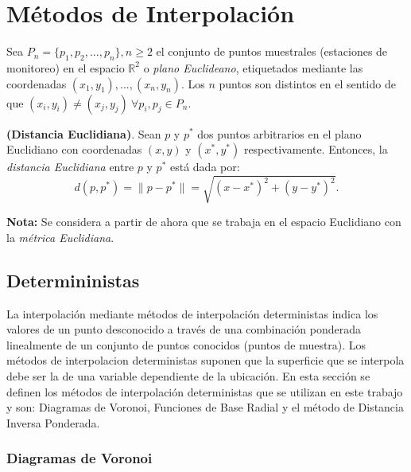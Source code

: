 \section{Métodos de Interpolación}

Sea $P_{n} = \{ p_{1}, p_{2}, ..., p_{n} \}, n \geq 2$ el conjunto de puntos muestrales (estaciones de monitoreo) en el espacio $\mathbb{R}^{2}$ o \textit{plano Euclideano}, etiquetados mediante las coordenadas $(x_{1}, y_{1}), ..., (x_{n}, y_{n})$. Los $n$ puntos son distintos en el sentido de que $(x_{i}, y_{i}) \neq (x_{j}, y_{j}) \ \forall p_{i}, p_{j} \in P_{n}$.


\begin{defn} \textbf{(Distancia Euclidiana)}. Sean $p$ y $p^{*}$ dos puntos arbitrarios en el plano Euclidiano con coordenadas $(x, y)$ y $(x^{*}, y^{*})$ respectivamente. Entonces, la \textit{distancia Euclidiana} entre $p$ y $p^{*}$ está dada por:
\begin{equation}
d(p, p^{*}) = \lVert p - p^{*} \rVert = \sqrt{ {(x-x^{*})}^{2} + {(y-y^{*})}^{2} }.
\end{equation} \end{defn}

\textbf{Nota:} Se considera a partir de ahora que se trabaja en el espacio Euclidiano con la \textit{métrica Euclidiana}.


\subsection{Determininistas}

La interpolación mediante métodos de interpolación deterministas indica los valores de un punto desconocido a través de una combinación ponderada linealmente de un conjunto de puntos conocidos (puntos de muestra). Los métodos de interpolacion deterministas suponen que la superficie que se interpola debe ser la de una variable dependiente de la ubicación. En esta sección se definen los métodos de interpolación deterministas que se utilizan en este trabajo y son: Diagramas de Voronoi, Funciones de Base Radial y el método de Distancia Inversa Ponderada.

\subsubsection{Diagramas de Voronoi}


